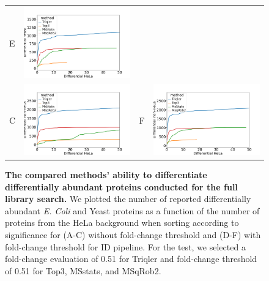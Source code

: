 \documentclass[11pt]{article}
\begin{document}
\begin{figure}[hbt]
\begin{tabular}{lclc}
        E & \includegraphics[width=0.4\linewidth]{../../result/plot_full_complete_full_lib_run_20221215/diff_HeLa_vs_nonHeLa_ID_yeast_0.51.png} \\
        C & \includegraphics[width=0.4\linewidth]{../../result/plot_full_complete_full_lib_run_20221215/diff_HeLa_vs_nonHeLa_ID_all_0.png} & 
        F & \includegraphics[width=0.4\linewidth]{../../result/plot_full_complete_full_lib_run_20221215/diff_HeLa_vs_nonHeLa_ID_all_0.51.png} \\ 

    \end{tabular}
    \caption{{\bf The compared methods' ability to differentiate differentially abundant proteins conducted for the full library search.} We plotted the number of reported differentially abundant  {\em E. Coli} and Yeast proteins as a function of the number of proteins from the HeLa background when sorting according to significance for (A-C) without fold-change threshold and (D-F) with fold-change threshold for ID pipeline. For the test, we selected a fold-change evaluation of 0.51 for Triqler and fold-change threshold of 0.51 for Top3, MSstats, and MSqRob2. \label{fig:ability_to_differentiate_differentially_abundant_specie_vs_hela_full_lib}}
\end{figure}
\end{document}
